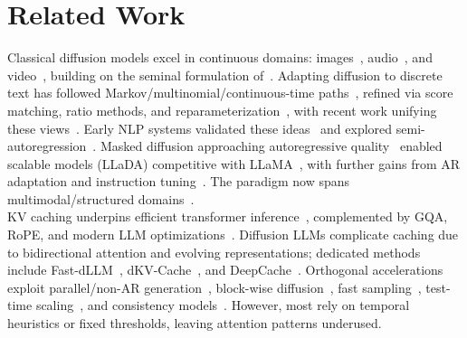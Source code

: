 \documentclass{article} %
\theoremstyle{definition}
\theoremstyle{remark}
\begin{document}
\vspace{-0.05in}
\section{Related Work}
\vspace{-0.05in}

Classical diffusion models excel in continuous domains: images~\citep{ho2020denoising,dhariwal2021diffusion,rombach2022highresolutionimagesynthesislatent}, audio~\citep{yang2023diffsounddiscretediffusionmodel,huang2023makeanaudiotexttoaudiogenerationpromptenhanced}, and video~\citep{xing2024survey,ho2022imagen,ho2022video}, building on the seminal formulation of~\citet{sohl2015deep}. Adapting diffusion to discrete text has followed Markov/multinomial/continuous-time paths~\citep{austin2021structured,hoogeboom2021argmax,hoogeboom2021autoregressive,campbell2022continuous,sun2022score}, refined via score matching, ratio methods, and reparameterization~\citep{meng2022concrete,lou2023reflected,Zheng2023ARD}, with recent work unifying these views~\citep{sahoo2024simple,shi2024simplified,ou2024your,zheng2024masked}. Early NLP systems validated these ideas~\citep{he2022diffusionbert,li2022diffusion,gong2022diffuseq} and explored semi-autoregression~\citep{han2022ssd}. Masked diffusion approaching autoregressive quality~\citep{sahoo2024simple} enabled scalable models (LLaDA) competitive with LLaMA~\citep{nie2025large,nie2024scaling,touvron2023llama,dubey2024llama}, with further gains from AR adaptation and instruction tuning~\citep{gong2024scaling,zhu2025llada15variancereducedpreference,dream2025}. The paradigm now spans multimodal/structured domains~\citep{you2025llada,yang2025mmada,yu2025dimplediscretediffusionmultimodal,wang2024diffusion,wang2024dplm,kitouni2023disk}.
\\
KV caching underpins efficient transformer inference~\citep{vaswani2017attention,pope2023efficiently}, complemented by GQA, RoPE, and modern LLM optimizations~\citep{ainslie2023gqa,su2024roformer,touvron2023llama,touvron2023llama2,dubey2024llama}. Diffusion LLMs complicate caching due to bidirectional attention and evolving representations; dedicated methods include Fast-dLLM~\citep{wu2025fast}, dKV-Cache~\citep{ma2025dkv}, and DeepCache~\citep{ma2024deepcache}. Orthogonal accelerations exploit parallel/non-AR generation~\citep{gu2017non,xiao2023surveynonautoregressivegenerationneural}, block-wise diffusion~\citep{arriola2025blockdiffusioninterpolatingautoregressive}, fast sampling~\citep{chen2023fast}, test-time scaling~\citep{ramesh2025test}, and consistency models~\citep{kou2024cllms}. However, most rely on temporal heuristics or fixed thresholds, leaving attention patterns underused.
\end{document}
